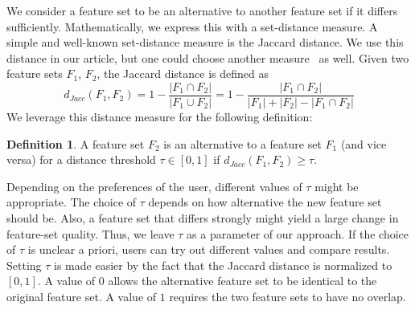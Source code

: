 \documentclass{article}
\theoremstyle{definition}
\newtheorem{definition}{Definition}
\begin{document}
We consider a feature set to be an alternative to another feature set if it differs sufficiently.
Mathematically, we express this with a set-distance measure.
A simple and well-known set-distance measure is the Jaccard distance.
We use this distance in our article, but one could choose another measure~\cite{egghe2009new} as well.
Given two feature sets $F_1$, $F_2$, the Jaccard distance is defined as
%
\begin{equation}
	d_{Jacc}(F_1,F_2) = 1 - \frac{|F_1 \cap F_2|}{|F_1 \cup F_2|} = 1 - \frac{|F_1 \cap F_2|}{|F_1| + |F_2| - |F_1 \cap F_2|}
	\label{eq:jaccard}
\end{equation}
%
We leverage this distance measure for the following definition:
%
\begin{definition}
	A feature set $F_2$ is an alternative to a feature set $F_1$ (and vice versa) for a distance threshold $\tau \in [0,1]$ if $d_{Jacc}(F_1,F_2) \geq \tau$.
	\label{def:single-alternative}
\end{definition}
%
Depending on the preferences of the user, different values of $\tau$ might be appropriate.
The choice of $\tau$ depends on how alternative the new feature set should be.
Also, a feature set that differs strongly might yield a large change in feature-set quality.
Thus, we leave $\tau$ as a parameter of our approach.
If the choice of $\tau$ is unclear a priori, users can try out different values and compare results.
Setting $\tau$ is made easier by the fact that the Jaccard distance is normalized to $[0,1]$.
A value of $0$ allows the alternative feature set to be identical to the original feature set.
A value of $1$ requires the two feature sets to have no overlap.
\end{document}
